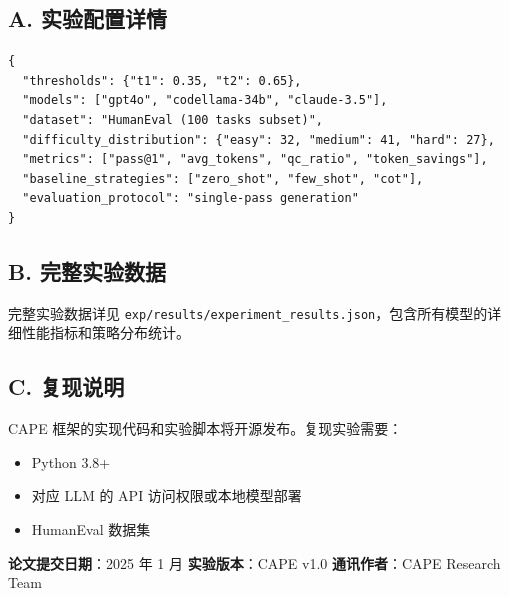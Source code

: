 \documentclass[11pt,a4paper]{article}
\begin{document}
\subsection*{A. 实验配置详情}

\begin{verbatim}
{
  "thresholds": {"t1": 0.35, "t2": 0.65},
  "models": ["gpt4o", "codellama-34b", "claude-3.5"],
  "dataset": "HumanEval (100 tasks subset)",
  "difficulty_distribution": {"easy": 32, "medium": 41, "hard": 27},
  "metrics": ["pass@1", "avg_tokens", "qc_ratio", "token_savings"],
  "baseline_strategies": ["zero_shot", "few_shot", "cot"],
  "evaluation_protocol": "single-pass generation"
}
\end{verbatim}

\subsection*{B. 完整实验数据}

完整实验数据详见 \texttt{exp/results/experiment\_results.json}，包含所有模型的详细性能指标和策略分布统计。

\subsection*{C. 复现说明}

CAPE 框架的实现代码和实验脚本将开源发布。复现实验需要：
\begin{itemize}
    \item Python 3.8+
    \item 对应 LLM 的 API 访问权限或本地模型部署
    \item HumanEval 数据集
\end{itemize}

\vspace{2em}
\begin{center}
\textbf{论文提交日期}：2025 年 1 月 \quad 
\textbf{实验版本}：CAPE v1.0 \quad 
\textbf{通讯作者}：CAPE Research Team
\end{center}
\end{document}
